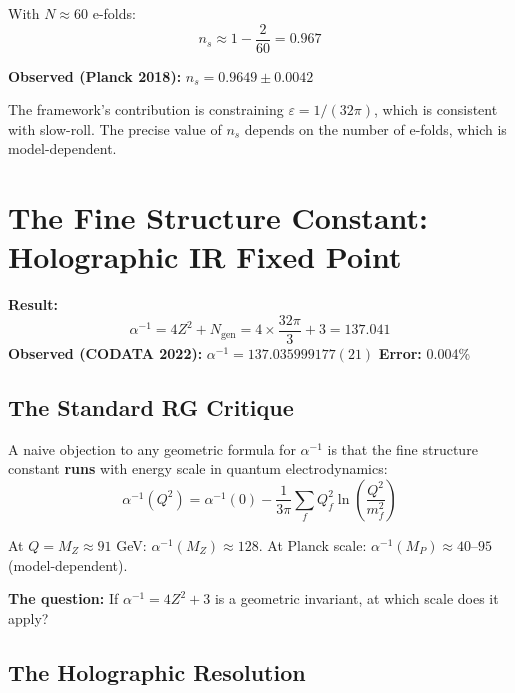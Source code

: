 \documentclass[12pt,a4paper]{article}
\newcommand{\Zsq}{Z^2}
\newcommand{\Ngen}{N_{\text{gen}}}
\begin{document}
With $N \approx 60$ e-folds:
\begin{equation}
\boxed{n_s \approx 1 - \frac{2}{60} = 0.967}
\end{equation}

\textbf{Observed (Planck 2018):} $n_s = 0.9649 \pm 0.0042$

The framework's contribution is constraining $\varepsilon = 1/(32\pi)$, which is consistent with slow-roll. The precise value of $n_s$ depends on the number of e-folds, which is model-dependent.

\section{The Fine Structure Constant: Holographic IR Fixed Point}
\label{sec:alpha}

\begin{derivedbox}
\textbf{Result:}
\begin{equation}
\alpha^{-1} = 4\Zsq + \Ngen = 4 \times \frac{32\pi}{3} + 3 = 137.041
\end{equation}
\textbf{Observed (CODATA 2022):} $\alpha^{-1} = 137.035999177(21)$ \quad \textbf{Error:} 0.004\%
\end{derivedbox}

\subsection{The Standard RG Critique}

A naive objection to any geometric formula for $\alpha^{-1}$ is that the fine structure constant \textbf{runs} with energy scale in quantum electrodynamics:
\begin{equation}
\alpha^{-1}(Q^2) = \alpha^{-1}(0) - \frac{1}{3\pi} \sum_f Q_f^2 \ln\left(\frac{Q^2}{m_f^2}\right)
\end{equation}

At $Q = M_Z \approx 91$ GeV: $\alpha^{-1}(M_Z) \approx 128$. At Planck scale: $\alpha^{-1}(M_P) \approx 40$--$95$ (model-dependent).

\textbf{The question:} If $\alpha^{-1} = 4\Zsq + 3$ is a geometric invariant, at which scale does it apply?

\subsection{The Holographic Resolution}
\end{document}
